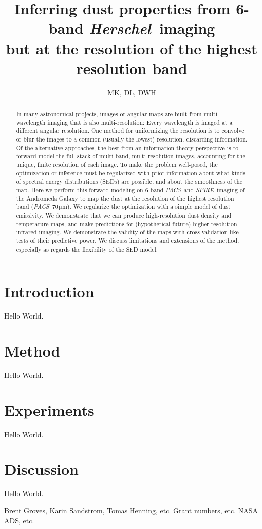\documentclass[12pt, preprint]{aastex}
\newcommand{\project}[1]{\textsl{#1}}
\newcommand{\Herschel}{\project{Herschel}}
\newcommand{\acronym}[1]{{\small{#1}}}
\newcommand{\PACS}{\project{\acronym{PACS}}}
\newcommand{\SPIRE}{\project{\acronym{SPIRE}}}
\newcommand{\unit}[1]{{\mathrm{#1}}}
\newcommand{\mum}{\unit{\mu m}}
\begin{document}
\title{Inferring dust properties from 6-band \Herschel\ imaging \\ 
       but at the resolution of the highest resolution band}
\author{MK, DL, DWH}

\begin{abstract}
In many astronomical projects, images or angular maps are built from
multi-wavelength imaging that is also multi-resolution:
Every wavelength is imaged at a different angular resolution.
One method for uniformizing the resolution is to convolve or blur the
images to a common (usually the lowest) resolution, discarding
information.
Of the alternative approaches, the best from an information-theory
perspective is to forward model the full stack of multi-band,
multi-resolution images, accounting for the unique, finite resolution
of each image.
To make the problem well-posed, the optimization or inference must be
regularized with prior information about what kinds of spectral energy
distributions (\acronym{SED}s) are possible, and about the smoothness of the map.
Here we perform this forward modeling on 6-band \PACS\ and
\SPIRE\ imaging of the Andromeda Galaxy to map the dust at the resolution
of the highest resolution band (\PACS~$70\,\mum$).
We regularize the optimization with a simple model of dust emissivity.
We demonstrate that we can produce high-resolution dust density and
temperature maps, and make predictions for (hypothetical future)
higher-resolution infrared imaging.
We demonstrate the validity of the maps with cross-validation-like
tests of their predictive power.
We discuss limitations and extensions of the method, especially as
regards the flexibility of the \acronym{SED} model.
\end{abstract}

\section{Introduction}

Hello World.

\section{Method}

Hello World.

\section{Experiments}

Hello World.

\section{Discussion}

Hello World.

\acknowledgements
Brent Groves, Karin Sandstrom, Tomas Henning, etc.
Grant numbers, etc.
\acronym{NASA ADS}, etc.
\end{document}
